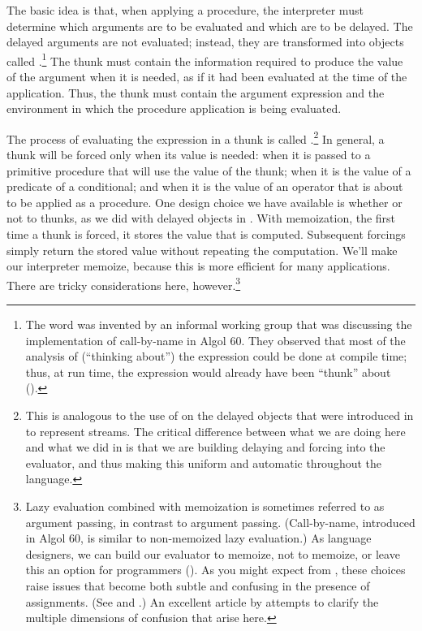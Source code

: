 The basic idea is that, when applying a procedure, the interpreter must
determine which arguments are to be evaluated and which are to be delayed.  The
delayed arguments are not evaluated; instead, they are transformed into objects
called .\footnote{The word  was invented by an
informal working group that was discussing the implementation of call-by-name
in Algol 60.  They observed that most of the analysis of (``thinking about'')
the expression could be done at compile time; thus, at run time, the expression
would already have been ``thunk'' about ().} The thunk must
contain the information required to produce the value of the argument when it
is needed, as if it had been evaluated at the time of the application.  Thus,
the thunk must contain the argument expression and the environment in which the
procedure application is being evaluated.

The process of evaluating the expression in a thunk is called
.\footnote{This is analogous to the use of  on the
delayed objects that were introduced in  to represent streams.
The critical difference between what we are doing here and what we did in
 is that we are building delaying and forcing into the
evaluator, and thus making this uniform and automatic throughout the language.}
In general, a thunk will be forced only when its value is needed: when it is
passed to a primitive procedure that will use the value of the thunk; when it
is the value of a predicate of a conditional; and when it is the value of an
operator that is about to be applied as a procedure.  One design choice we have
available is whether or not to  thunks, as we did with delayed
objects in .  With memoization, the first time a thunk is
forced, it stores the value that is computed.  Subsequent forcings simply
return the stored value without repeating the computation.  We'll make our
interpreter memoize, because this is more efficient for many applications.
There are tricky considerations here, however.\footnote{Lazy evaluation
combined with memoization is sometimes referred to as 
argument passing, in contrast to  argument passing.
(Call-by-name, introduced in Algol 60, is similar to non-memoized lazy
evaluation.)  As language designers, we can build our evaluator to memoize, not
to memoize, or leave this an option for programmers ().  As
you might expect from , these choices raise issues that become
both subtle and confusing in the presence of assignments.  (See 
and .)  An excellent article by 
attempts to clarify the multiple dimensions of confusion that arise here.}

